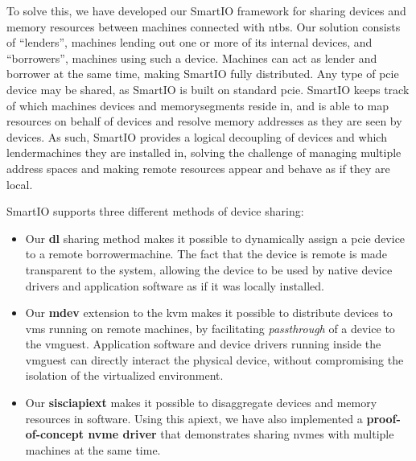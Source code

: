 To solve this, we have developed our SmartIO framework for sharing devices and memory resources between machines connected with \glspl{ntb}.
%
Our solution consists of ``\glspl{lender}'', machines lending out one or more of its internal devices, and ``\glspl{borrower}'', machines using such a device.
%
Machines can act as \gls{lender} and \gls{borrower} at the same time, making SmartIO fully distributed.
%
Any type of \gls{pcie} device may be shared, as SmartIO is built on standard \gls{pcie}.
%
SmartIO keeps track of which machines devices and \glspl{memorysegment} reside in, and is able to map resources on behalf of devices and resolve memory addresses as they are seen by devices.
%
As such, SmartIO provides a logical decoupling of devices and which \glspl{lendermachine} they are installed in, solving the challenge of managing multiple address spaces and making remote resources appear and behave as if they are local.




SmartIO supports three different methods of device sharing:
%
\begin{itemize}
    \item Our \textbf{\gls{dl}} sharing method makes it possible to dynamically assign a \gls{pcie} device to a remote \gls{borrowermachine}.
        The fact that the device is remote is made transparent to the system, allowing the device to be used by native device drivers and application software as if it was locally installed.


    \item Our \textbf{\gls{mdev}} extension to the \gls{kvm} makes it possible to distribute devices to \glspl{vm} running on remote machines, by facilitating \emph{\gls{passthrough}} of a device to the \gls{vmguest}.
        Application software and device drivers running inside the \gls{vmguest} can directly interact the physical device, without compromising the isolation of the virtualized environment.


    \item Our \textbf{\gls{sisciapiext}} makes it possible to \gls{disaggregate} devices and memory resources in software.
        Using this \gls{apiext}, we have also implemented a \textbf{proof-of-concept \gls{nvme} driver} that demonstrates sharing \glspl{nvme} with multiple machines at the same time.
        
\end{itemize}




